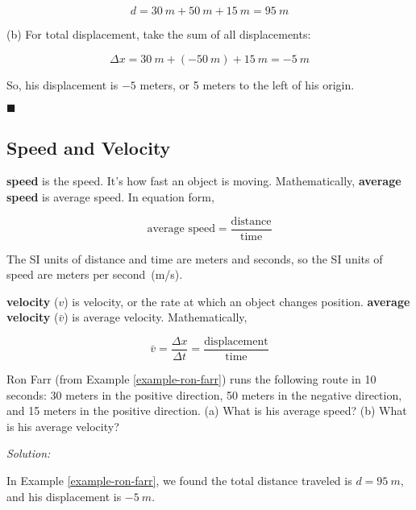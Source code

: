 \documentclass[dvipsnames]{article}
\begin{document}
\begin{equation*}
    d = \SI{30}{m} + \SI{50}{m} + \SI{15}{m} = \boxed{\SI{95}{m}}
\end{equation*}

(b) For total displacement, take the sum of all displacements:

\begin{equation*}
    \Delta x = \SI{30}{m} + (-\SI{50}{m}) + \SI{15}{m} = \boxed{\SI{-5}{m}}
\end{equation*}

So, his displacement is $-5$ meters, or 5 meters to the left of his origin.

\hfill $\blacksquare$

\subsection{Speed and Velocity}

\textbf{\Gls{speed}} is the \glsdesc{speed}. It's how fast an object is moving. Mathematically, \textbf{\gls{average speed}} is \glsdesc{average speed}. In equation form,

\begin{equation}
    \text{average speed} = \frac{\mathrm{distance}}{\mathrm{time}}
\end{equation}

The SI units of distance and time are meters and seconds, so the SI units of speed are meters per second~(m/s).

\textbf{\Gls{velocity}} ($v$) is \glsdesc{velocity}, or the rate at which an object changes position. \textbf{\Gls{average velocity}} ($\bar{v}$) is \glsdesc{average velocity}. Mathematically, 

\begin{equation} \label{average-velocity}
    \bar{v} = \frac{\Delta x}{\Delta t} = \frac{\mathrm{displacement}}{\mathrm{time}}
\end{equation}

\begin{example}
    Ron Farr (from Example \ref{example-ron-farr}) runs the following route in 10 seconds: 30 meters in the positive direction, 50 meters in the negative direction, and 15 meters in the positive direction. (a) What is his average speed? (b) What is his average velocity?
\end{example}

\textit{Solution:}

In Example \ref{example-ron-farr}, we found the total distance traveled is $d = \SI{95}{m}$, and his displacement is $\SI{-5}{m}$.
\end{document}
